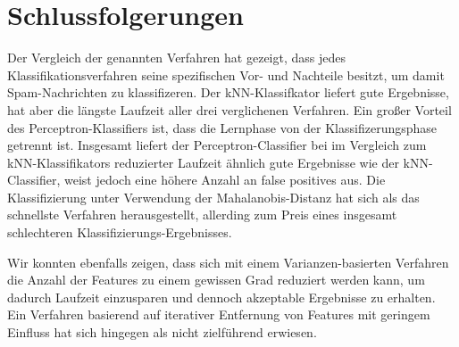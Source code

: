 \chapter{Schlussfolgerungen}
\label{ch:conclusion}

Der Vergleich der genannten Verfahren hat gezeigt, dass jedes Klassifikationsverfahren seine spezifischen Vor- und Nachteile besitzt, um damit Spam-Nachrichten zu klassifizeren. Der kNN-Klassifkator liefert gute Ergebnisse, hat aber die längste Laufzeit aller drei verglichenen Verfahren. Ein großer Vorteil des Perceptron-Klassifiers ist, dass die Lernphase von der Klassifizerungsphase getrennt ist. Insgesamt liefert der Perceptron-Classifier bei im Vergleich zum kNN-Klassifikators reduzierter Laufzeit ähnlich gute Ergebnisse wie der kNN-Classifier, weist jedoch eine höhere Anzahl an false positives aus. Die Klassifizierung unter Verwendung der Mahalanobis-Distanz hat sich als das schnellste Verfahren herausgestellt, allerding zum Preis eines insgesamt schlechteren Klassifizierungs-Ergebnisses.

Wir konnten ebenfalls zeigen, dass sich mit einem Varianzen-basierten Verfahren die Anzahl der Features zu einem gewissen Grad reduziert werden kann, um dadurch Laufzeit einzusparen und dennoch akzeptable Ergebnisse zu erhalten. Ein Verfahren basierend auf iterativer Entfernung von Features mit geringem Einfluss hat sich hingegen als nicht zielführend erwiesen.